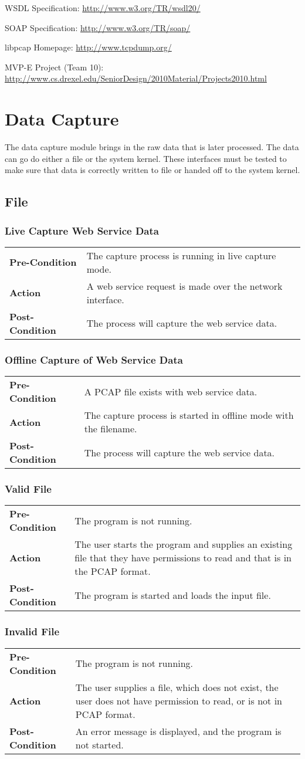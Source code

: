 \documentclass[titlepage]{article}
\newcommand{\testentry}[4]{
    \subsubsection{#1}
    \begin{center}
    \begin{tabular}{| l p{0.7\textwidth}|}
        \hline
        \bf Pre-Condition & #2 \\
        \bf Action & #3 \\
        \bf Post-Condition & #4 \\\hline
    \end{tabular}
    \end{center}
}
\begin{document}
\begin{itemize*}
    \item WSDL Specification: \url{http://www.w3.org/TR/wsdl20/}
    \item SOAP Specification: \url{http://www.w3.org/TR/soap/}
    \item libpcap Homepage: \url{http://www.tcpdump.org/}
    \item MVP-E Project (Team 10): \url{http://www.cs.drexel.edu/SeniorDesign/2010Material/Projects2010.html}
\end{itemize*}


\section{Data Capture}
The data capture module brings in the raw data that is later processed. The
data can go do either a file or the system kernel. These interfaces must be
tested to make sure that data is correctly written to file or handed off to the
system kernel.


\subsection{File}

\testentry{Live Capture Web Service Data}
    {The capture process is running in live capture mode.}
    {A web service request is made over the network interface.}
    {The process will capture the web service data.}
     
\testentry{Offline Capture of Web Service Data}
    {A PCAP file exists with web service data.}
    {The capture process is started in offline mode with the filename.}
    {The process will capture the web service data.}

\testentry{Valid File}
    {The program is not running.}
    {The user starts the program and supplies an existing file that they have
        permissions to read and that is in the PCAP format.}
    {The program is started and loads the input file.}

\testentry{Invalid File}
    {The program is not running.}
    {The user supplies a file, which does not exist, the user does not have
        permission to read, or is not in PCAP format.}
    {An error message is displayed, and the program is not started.}
\end{document}
